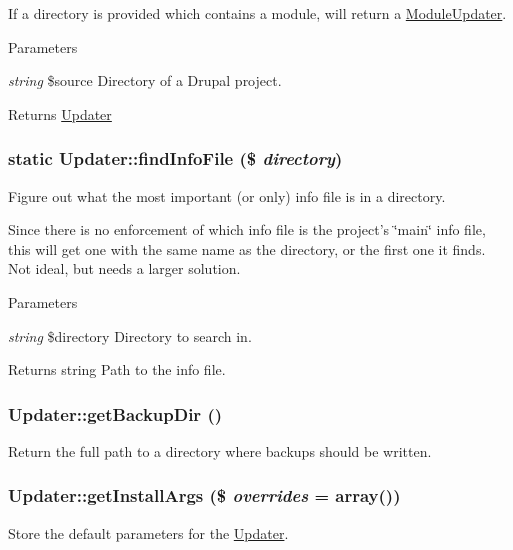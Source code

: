 If a directory is provided which contains a module, will return a \hyperlink{classModuleUpdater}{ModuleUpdater}.


\begin{DoxyParams}{Parameters}
\item[{\em string}]\$source Directory of a Drupal project.\end{DoxyParams}
\begin{DoxyReturn}{Returns}
\hyperlink{classUpdater}{Updater} 
\end{DoxyReturn}
\hypertarget{classUpdater_a863027ebe605c77fe1c9b7676eb031f1}{
\subsubsection[{findInfoFile}]{\setlength{\rightskip}{0pt plus 5cm}static Updater::findInfoFile (\$ {\em directory})}}
\label{classUpdater_a863027ebe605c77fe1c9b7676eb031f1}
Figure out what the most important (or only) info file is in a directory.

Since there is no enforcement of which info file is the project's \char`\"{}main\char`\"{} info file, this will get one with the same name as the directory, or the first one it finds. Not ideal, but needs a larger solution.


\begin{DoxyParams}{Parameters}
\item[{\em string}]\$directory Directory to search in.\end{DoxyParams}
\begin{DoxyReturn}{Returns}
string Path to the info file. 
\end{DoxyReturn}
\hypertarget{classUpdater_a0384d0bc433f259a81db0f61bd49d9c8}{
\subsubsection[{getBackupDir}]{\setlength{\rightskip}{0pt plus 5cm}Updater::getBackupDir ()}}
\label{classUpdater_a0384d0bc433f259a81db0f61bd49d9c8}
Return the full path to a directory where backups should be written. \hypertarget{classUpdater_a540e2f8213091a530b45d1bb4edbc36a}{
\subsubsection[{getInstallArgs}]{\setlength{\rightskip}{0pt plus 5cm}Updater::getInstallArgs (\$ {\em overrides} = {\ttfamily array()})}}
\label{classUpdater_a540e2f8213091a530b45d1bb4edbc36a}
Store the default parameters for the \hyperlink{classUpdater}{Updater}.


